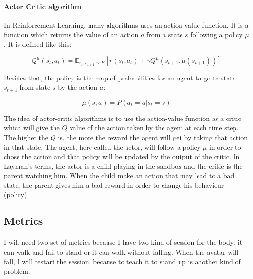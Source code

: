 \documentclass{article}
\begin{document}
\paragraph{Actor Critic algorithm}

In Reinforcement Learning, many algorithms uses an action-value function.
It is a function which returns the value of an action $a$ from a state $s$
following a policy $\mu$. It is defined like this: 
  
\begin{equation}
  Q^\mu(s_t,a_t) = \mathbb{E}_{r_t,s_{t+1}\sim{E}}[r(s_t,a_t) + \gamma
  Q^\mu(s_{t+1}, \mu(s_{t+1}))]
\end{equation}

Besides that, the policy is the map of probabilities for an agent to go
to state $s_{t+1}$ from state $s$ by the action $a$:

\begin{equation}
  \mu(s,a) = P(a_t=a|s_t=s)
\end{equation}

The idea of actor-critic algorithms is to use the action-value function as a
critic which will give the $Q$ value of the action taken by the agent at each time
step. The higher the $Q$ is, the more the reward the agent will get by taking
that action in that state. The agent, here called the actor, will follow a
policy $\mu$ in order to chose the action and that policy will be updated by the
output of the critic. In Layman's terms, the actor is a child playing in the
sandbox and the critic is the parent watching him. When the child make an action
that may lead to a bad state, the parent gives him a bad reward in order to
change his behaviour (policy).

\subsection{Metrics}

\paragraph{}
I will need two set of metrics because I have two kind of session for the body:
it can walk and fail to stand or it can walk without falling. When the avatar
will fall, I will restart the session, because to teach it to stand up is
another kind of problem.
\end{document}
